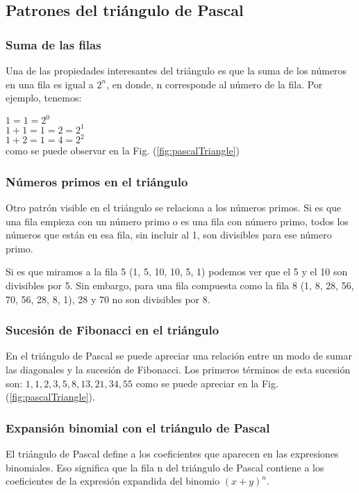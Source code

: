 \subsection{Patrones del triángulo de Pascal}

\subsubsection{Suma de las filas}

Una de las propiedades interesantes del triángulo es que la suma de los números
en una fila es igual a $2^n$, en donde, n corresponde al número de la fila. Por
ejemplo, tenemos:

$ 1 = 1 = 2^0 $ \\
$ 1 + 1 = 1 = 2 = 2^1 $ \\
$ 1 + 2 = 1 = 4 = 2^2 $\\

como se puede observar en la Fig. (\ref{fig:pascalTriangle})

\subsubsection{Números primos en el triángulo}

Otro patrón visible en el triángulo se relaciona a los números primos. Si es que
una fila empieza con un número primo o es una fila con número primo, todos los
números que están en esa fila, sin incluir al 1, son divisibles para ese número
primo.

Si es que miramos a la fila 5 (1, 5, 10, 10, 5, 1) podemos ver que el 5 y el 10
son divisibles por 5. Sin embargo, para una fila compuesta como la fila 8 (1, 8,
28, 56, 70, 56, 28, 8, 1), 28 y 70 no son divisibles por 8.

\subsubsection{Sucesión de Fibonacci en el triángulo}
En el triángulo de Pascal se puede apreciar una relación entre un modo de sumar
las diagonales y la sucesión de Fibonacci. Los primeros términos de esta
sucesión son: $1,1,2,3,5,8,13,21,34,55$ como se puede apreciar en la Fig.
(\ref{fig:pascalTriangle}).

\subsubsection{Expansión binomial con el triángulo de Pascal}

El triángulo de Pascal define a los coeficientes que aparecen en las expresiones
binomiales. Eso significa que la fila n del triángulo de Pascal contiene a los
coeficientes de la expresión expandida del binomio $(x+y)^n$.